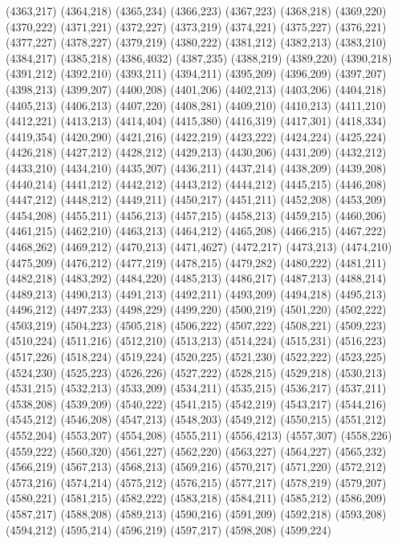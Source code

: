 (4363,217)
(4364,218)
(4365,234)
(4366,223)
(4367,223)
(4368,218)
(4369,220)
(4370,222)
(4371,221)
(4372,227)
(4373,219)
(4374,221)
(4375,227)
(4376,221)
(4377,227)
(4378,227)
(4379,219)
(4380,222)
(4381,212)
(4382,213)
(4383,210)
(4384,217)
(4385,218)
(4386,4032)
(4387,235)
(4388,219)
(4389,220)
(4390,218)
(4391,212)
(4392,210)
(4393,211)
(4394,211)
(4395,209)
(4396,209)
(4397,207)
(4398,213)
(4399,207)
(4400,208)
(4401,206)
(4402,213)
(4403,206)
(4404,218)
(4405,213)
(4406,213)
(4407,220)
(4408,281)
(4409,210)
(4410,213)
(4411,210)
(4412,221)
(4413,213)
(4414,404)
(4415,380)
(4416,319)
(4417,301)
(4418,334)
(4419,354)
(4420,290)
(4421,216)
(4422,219)
(4423,222)
(4424,224)
(4425,224)
(4426,218)
(4427,212)
(4428,212)
(4429,213)
(4430,206)
(4431,209)
(4432,212)
(4433,210)
(4434,210)
(4435,207)
(4436,211)
(4437,214)
(4438,209)
(4439,208)
(4440,214)
(4441,212)
(4442,212)
(4443,212)
(4444,212)
(4445,215)
(4446,208)
(4447,212)
(4448,212)
(4449,211)
(4450,217)
(4451,211)
(4452,208)
(4453,209)
(4454,208)
(4455,211)
(4456,213)
(4457,215)
(4458,213)
(4459,215)
(4460,206)
(4461,215)
(4462,210)
(4463,213)
(4464,212)
(4465,208)
(4466,215)
(4467,222)
(4468,262)
(4469,212)
(4470,213)
(4471,4627)
(4472,217)
(4473,213)
(4474,210)
(4475,209)
(4476,212)
(4477,219)
(4478,215)
(4479,282)
(4480,222)
(4481,211)
(4482,218)
(4483,292)
(4484,220)
(4485,213)
(4486,217)
(4487,213)
(4488,214)
(4489,213)
(4490,213)
(4491,213)
(4492,211)
(4493,209)
(4494,218)
(4495,213)
(4496,212)
(4497,233)
(4498,229)
(4499,220)
(4500,219)
(4501,220)
(4502,222)
(4503,219)
(4504,223)
(4505,218)
(4506,222)
(4507,222)
(4508,221)
(4509,223)
(4510,224)
(4511,216)
(4512,210)
(4513,213)
(4514,224)
(4515,231)
(4516,223)
(4517,226)
(4518,224)
(4519,224)
(4520,225)
(4521,230)
(4522,222)
(4523,225)
(4524,230)
(4525,223)
(4526,226)
(4527,222)
(4528,215)
(4529,218)
(4530,213)
(4531,215)
(4532,213)
(4533,209)
(4534,211)
(4535,215)
(4536,217)
(4537,211)
(4538,208)
(4539,209)
(4540,222)
(4541,215)
(4542,219)
(4543,217)
(4544,216)
(4545,212)
(4546,208)
(4547,213)
(4548,203)
(4549,212)
(4550,215)
(4551,212)
(4552,204)
(4553,207)
(4554,208)
(4555,211)
(4556,4213)
(4557,307)
(4558,226)
(4559,222)
(4560,320)
(4561,227)
(4562,220)
(4563,227)
(4564,227)
(4565,232)
(4566,219)
(4567,213)
(4568,213)
(4569,216)
(4570,217)
(4571,220)
(4572,212)
(4573,216)
(4574,214)
(4575,212)
(4576,215)
(4577,217)
(4578,219)
(4579,207)
(4580,221)
(4581,215)
(4582,222)
(4583,218)
(4584,211)
(4585,212)
(4586,209)
(4587,217)
(4588,208)
(4589,213)
(4590,216)
(4591,209)
(4592,218)
(4593,208)
(4594,212)
(4595,214)
(4596,219)
(4597,217)
(4598,208)
(4599,224)
